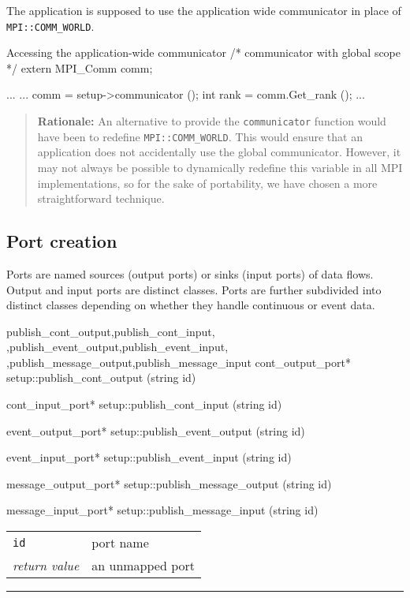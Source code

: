 \documentclass[a4paper]{report}
\makeatletter
\newenvironment{rationale}%
{\par\begin{quote}\textbf{Rationale:}}%
{\par\end{quote}}
\newenvironment{parameters}%
{\begin{tabular}{@{\hspace{2em}}lp{0.6\textwidth}}}%
{\end{tabular}\par\vspace{1mm}\par\hrule\par\vspace{5mm}}
\makeatother
\begin{document}
The application is supposed to use the application wide communicator
in place of
\lstinline|MPI::COMM_WORLD|.

\begin{code}{Accessing the application-wide communicator}
/* communicator with global scope */
extern MPI_Comm comm;

...
{
  ...
  comm = setup->communicator ();
  int rank = comm.Get_rank ();
  ...
}
\end{code}

\begin{rationale}
  An alternative to provide the \lstinline|communicator| function
  would have been to redefine \lstinline|MPI::COMM_WORLD|.  This would
  ensure that an application does not accidentally use the global
  communicator.  However, it may not always be possible to dynamically
  redefine this variable in all MPI implementations, so for the sake
  of portability, we have chosen a more straightforward technique.
\end{rationale}


\subsection{Port creation}

Ports are named sources (output ports) or sinks (input
ports) of data flows.  Output and input ports are distinct classes.
Ports are further subdivided into distinct classes depending on
whether they handle continuous or event data.

\begin{head}{publish_cont_output,publish_cont_input,
            ,publish_event_output,publish_event_input,
            ,publish_message_output,publish_message_input}
  cont_output_port* setup::publish_cont_output (string id)

  cont_input_port* setup::publish_cont_input (string id)

  event_output_port* setup::publish_event_output (string id)

  event_input_port* setup::publish_event_input (string id)

  message_output_port* setup::publish_message_output (string id)

  message_input_port* setup::publish_message_input (string id)
\end{head}
\begin{parameters}
  \lstinline|id| & port name \\
  \emph{return value} & an unmapped port \\
\end{parameters}
\end{document}
